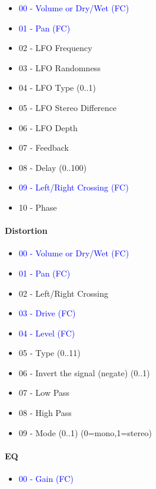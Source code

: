    \begin{itemize}
      \item \textcolor{blue}{00 - Volume or Dry/Wet (FC)}
      \item \textcolor{blue}{01 - Pan (FC)}
      \item 02 - LFO Frequency
      \item 03 - LFO Randomness
      \item 04 - LFO Type (0..1)
      \item 05 - LFO Stereo Difference
      \item 06 - LFO Depth
      \item 07 - Feedback
      \item 08 - Delay (0..100)
      \item \textcolor{blue}{09 - Left/Right Crossing (FC)}
      \item 10 - Phase
   \end{itemize}

\paragraph{Distortion}

   \begin{itemize}
      \item \textcolor{blue}{00 - Volume or Dry/Wet (FC)}
      \item \textcolor{blue}{01 - Pan (FC)}
      \item 02 - Left/Right Crossing
      \item \textcolor{blue}{03 - Drive (FC)}
      \item \textcolor{blue}{04 - Level (FC)}
      \item 05 - Type (0..11)
      \item 06 - Invert the signal (negate) (0..1)
      \item 07 - Low Pass
      \item 08 - High Pass
      \item 09 - Mode (0..1) (0=mono,1=stereo)
   \end{itemize}

\paragraph{EQ}

   \begin{itemize}
      \item \textcolor{blue}{00 - Gain (FC)}
   \end{itemize}

